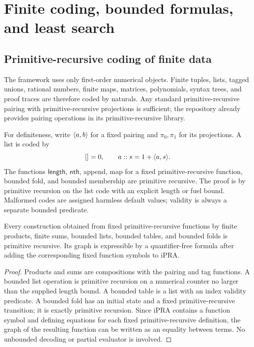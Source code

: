 \section{Finite coding, bounded formulas, and least search}

\subsection{Primitive-recursive coding of finite data}

The framework uses only first-order numerical objects.  Finite tuples, lists, tagged unions, rational numbers, finite maps, matrices, polynomials, syntax trees, and proof traces are therefore coded by naturals.  Any standard primitive-recursive pairing with primitive-recursive projections is sufficient; the repository already provides pairing operations in its primitive-recursive library.

For definiteness, write \(\langle a,b\rangle\) for a fixed pairing and \(\pi_0,\pi_1\) for its projections.  A list is coded by
\[
  []=0,\qquad a::s=1+\langle a,s\rangle.
\]
The functions \(\mathsf{length}\), \(\mathsf{nth}\), append, map for a fixed primitive-recursive function, bounded fold, and bounded membership are primitive recursive.  The proof is by primitive recursion on the list code with an explicit length or fuel bound.  Malformed codes are assigned harmless default values; validity is always a separate bounded predicate.

\begin{lemma}\label{lem:coding}
Every construction obtained from fixed primitive-recursive functions by finite products, finite sums, bounded lists, bounded tables, and bounded folds is primitive recursive.  Its graph is expressible by a quantifier-free formula after adding the corresponding fixed function symbols to iPRA.
\end{lemma}

\begin{proof}
Products and sums are compositions with the pairing and tag functions.  A bounded list operation is primitive recursion on a numerical counter no larger than the supplied length bound.  A bounded table is a list with an index validity predicate.  A bounded fold has an initial state and a fixed primitive-recursive transition; it is exactly primitive recursion.  Since iPRA contains a function symbol and defining equations for each fixed primitive-recursive definition, the graph of the resulting function can be written as an equality between terms.  No unbounded decoding or partial evaluator is involved.
\end{proof}

